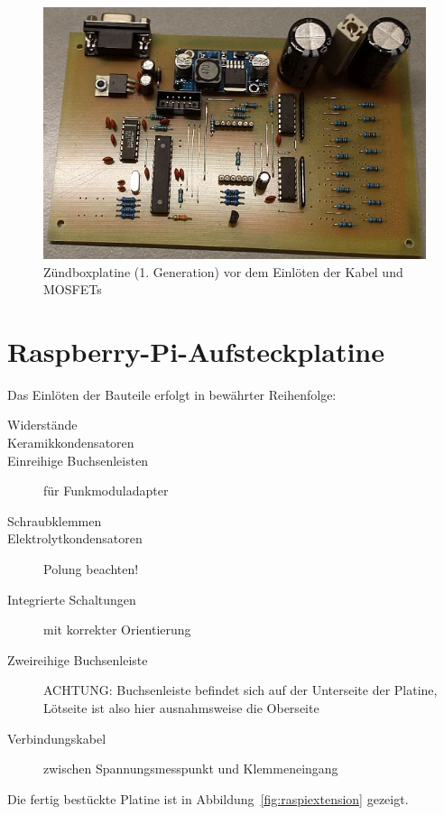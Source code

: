 \documentclass[paper=a4, parskip, numbers=noenddot, toc=listof, headsepline]{scrbook}
\begin{document}
					\begin{figure}
						\centering
						\includegraphics[width=\textwidth]{bilder/platinenzwischenschritt}
						\caption{Zündboxplatine (1. Generation) vor dem Einlöten der Kabel und MOSFETs}
						\label{fig:platinenzwischenschritt}
					\end{figure}

			\section{Raspberry-Pi-Aufsteckplatine}

				Das Einlöten der Bauteile erfolgt in bewährter Reihenfolge:
				\begin{description}
					\item[Widerstände]
					\item[Keramikkondensatoren]
					\item[Einreihige Buchsenleisten] für Funkmoduladapter
					\item[Schraubklemmen]
					\item[Elektrolytkondensatoren] Polung beachten!
					\item[Integrierte Schaltungen] mit korrekter Orientierung
					\item[Zweireihige Buchsenleiste] ACHTUNG: Buchsenleiste befindet sich auf der Unterseite der Platine, Lötseite ist also hier ausnahmsweise die Oberseite
					\item[Verbindungskabel] zwischen Spannungsmesspunkt und Klemmeneingang
				\end{description}

				Die fertig bestückte Platine ist in Abbildung~\ref{fig:raspiextension} gezeigt.
\end{document}
